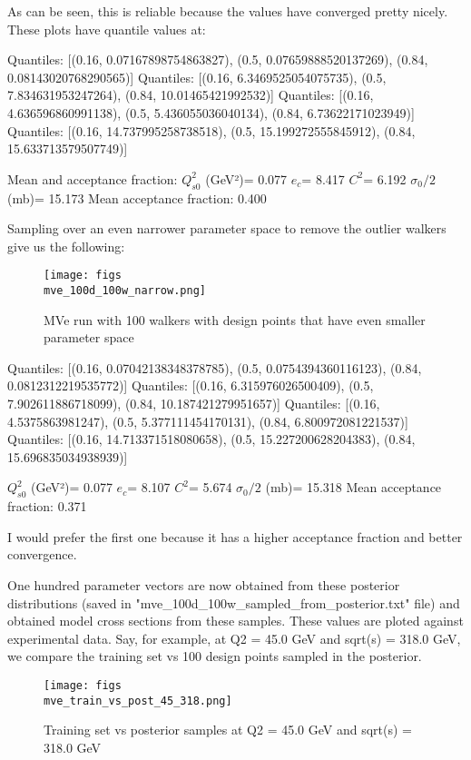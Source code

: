 \documentclass{article}
\begin{document}
As can be seen, this is reliable because the values have converged pretty nicely. These plots have quantile values at:

Quantiles: [(0.16, 0.07167898754863827), (0.5, 0.07659888520137269), (0.84, 0.08143020768290565)]
Quantiles: [(0.16, 6.3469525054075735), (0.5, 7.834631953247264), (0.84, 10.01465421992532)]
Quantiles: [(0.16, 4.636596860991138), (0.5, 5.436055036040134), (0.84, 6.73622171023949)]
Quantiles: [(0.16, 14.737995258738518), (0.5, 15.199272555845912), (0.84, 15.633713579507749)]

Mean and acceptance fraction:
$Q_{s0}^{2}$ (GeV²)= 0.077
$e_c$= 8.417
$C^{2}$= 6.192
$\sigma_0/2$ (mb)= 15.173
Mean acceptance fraction: 0.400

Sampling over an even narrower parameter space to remove the outlier walkers give us the following:

\begin{figure}
\centering
\texttt{[image: figs\\mve\_100d\_100w\_narrow.png]}
\caption{MVe run with 100 walkers with design points that have even smaller parameter space}
\label{fig:mve_100d_100w_narrow}
\end{figure}

Quantiles: [(0.16, 0.07042138348378785), (0.5, 0.0754394360116123), (0.84, 0.0812312219535772)]
Quantiles: [(0.16, 6.315976026500409), (0.5, 7.902611886718099), (0.84, 10.187421279951657)]
Quantiles: [(0.16, 4.5375863981247), (0.5, 5.377111454170131), (0.84, 6.800972081221537)]
Quantiles: [(0.16, 14.713371518080658), (0.5, 15.227200628204383), (0.84, 15.696835034938939)]

$Q_{s0}^{2}$ (GeV²)= 0.077
$e_c$= 8.107
$C^{2}$= 5.674
$\sigma_0/2$ (mb)= 15.318
Mean acceptance fraction: 0.371

I would prefer the first one because it has a higher acceptance fraction and better convergence.

One hundred parameter vectors are now obtained from these posterior distributions (saved in "mve_100d_100w_sampled_from_posterior.txt" file) and obtained model cross sections from these samples. These values are ploted against experimental data. Say, for example, at Q2 = 45.0 GeV and sqrt(s) = 318.0 GeV, we compare the training set vs 100 design points sampled in the posterior.

\begin{figure}
\centering
\texttt{[image: figs\\mve\_train\_vs\_post\_45\_318.png]}
\caption{Training set vs posterior samples at Q2 = 45.0 GeV and sqrt(s) = 318.0 GeV}
\label{fig:mve_train_vs_post_45_318}
\end{figure}
\end{document}
